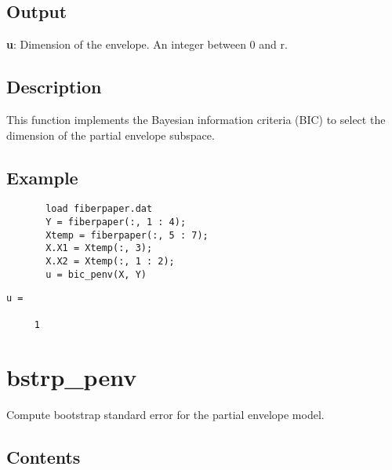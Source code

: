 \documentclass[a4paper,11pt,openany]{memoir}
\begin{document}
\subsection*{Output}

\begin{par}
\textbf{u}: Dimension of the envelope. An integer between 0 and r.
\end{par} \vspace{1em}


\subsection*{Description}

\begin{par}
This function implements the Bayesian information criteria (BIC) to select the dimension of the partial envelope subspace.
\end{par} \vspace{1em}


\subsection*{Example}


\begin{verbatim}       load fiberpaper.dat
       Y = fiberpaper(:, 1 : 4);
       Xtemp = fiberpaper(:, 5 : 7);
       X.X1 = Xtemp(:, 3);
       X.X2 = Xtemp(:, 1 : 2);
       u = bic_penv(X, Y)\end{verbatim}
    
        \color{lightgray}\ttfamily \begin{verbatim}
u =

     1

\end{verbatim} \rmfamily
\color{black}
    
\newpage


\rmfamily
\color{black}\section{bstrp\_penv}

\begin{par}
Compute bootstrap standard error for the partial envelope model.
\end{par} \vspace{1em}

\subsection*{Contents}
\end{document}
